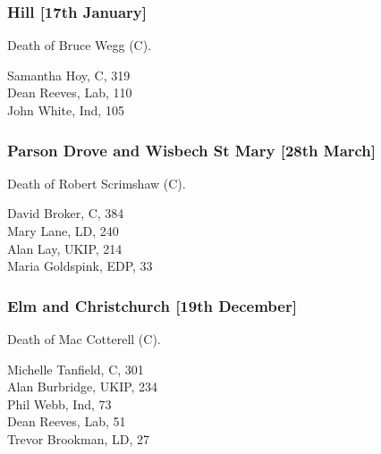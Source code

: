 \documentclass[a4paper,openany,10pt]{book}
\begin{document}
\subsubsection*{Hill \hspace*{\fill}\nolinebreak[1]%
\enspace\hspace*{\fill}
[17th January]}


Death of Bruce Wegg (C).



Samantha Hoy, C, 319\\
Dean Reeves, Lab, 110\\
John White, Ind, 105\\


\subsubsection*{Parson Drove and Wisbech St Mary \hspace*{\fill}\nolinebreak[1]%
\enspace\hspace*{\fill}
[28th March]}


Death of Robert Scrimshaw (C).



David Broker, C, 384\\
Mary Lane, LD, 240\\
Alan Lay, UKIP, 214\\
Maria Goldspink, EDP, 33\\


\subsubsection*{Elm and Christchurch \hspace*{\fill}\nolinebreak[1]%
\enspace\hspace*{\fill}
[19th December]}


Death of Mac Cotterell (C).



Michelle Tanfield, C, 301\\
Alan Burbridge, UKIP, 234\\
Phil Webb, Ind, 73\\
Dean Reeves, Lab, 51\\
Trevor Brookman, LD, 27\\
\end{document}
